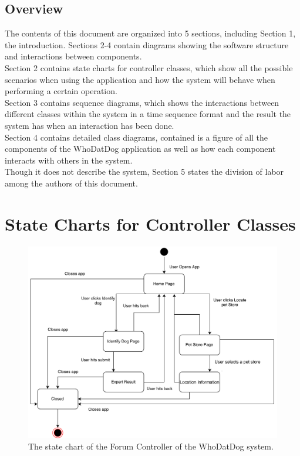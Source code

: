 \documentclass[]{article}
\begin{document}
	\subsection{Overview}
	\label{sec:overview}
	
	The contents of this document are organized into 5 sections, including Section 1, the introduction. Sections 2-4 contain diagrams showing the software structure and interactions between components.\\Section 2 contains state charts for controller classes, which show all the possible scenarios when using the application and how the system will behave when performing a certain operation.\\Section 3 contains sequence diagrams, which shows the interactions between different classes within the system in a time sequence format and the result the system has when an interaction has been done.\\Section 4 contains detailed class diagrams, contained is a figure of all the components of the WhoDatDog application as well as how each component interacts with others in the system.\\Though it does not describe the system, Section 5 states the division of labor among the authors of this document.



\section{State Charts for Controller Classes}
\label{sec:state_charts_for_controller_classes}

\begin{figure}[H]
	\centering
	\includegraphics[width=\textwidth]{ForumController.jpg}
	\caption{\label{fig:analysisclassdiagram}The state chart of the Forum Controller of the WhoDatDog system.}
\end{figure}
\end{document}
